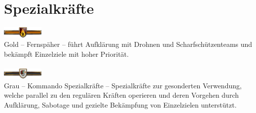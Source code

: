 \section{Spezialkräfte}
\includegraphics[width=20mm]{./img/truppengattungen/spezialeinheiten/TrGold}\\
Gold -- Fernspäher -- führt Aufklärung mit Drohnen und Scharfschützenteams und bekämpft Einzelziele mit hoher Priorität.\\\\
\includegraphics[width=20mm]{./img/truppengattungen/spezialeinheiten/TrGrau}\\
Grau -- Kommando Spezialkräfte -- Spezialkräfte zur gesonderten Verwendung, welche parallel zu den regulären Kräften operieren und deren Vorgehen durch Aufklärung, Sabotage und gezielte Bekämpfung von Einzelzielen unterstützt.
